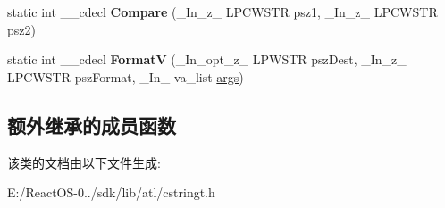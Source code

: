 \begin{DoxyCompactItemize}
\item 
\mbox{\label{class_a_t_l_1_1_ch_traits_c_r_t_a1699bde99948f27e268fe49dbe222815}} 
static int \+\_\+\+\_\+cdecl {\bfseries Compare} (\+\_\+\+In\+\_\+z\+\_\+ L\+P\+C\+W\+S\+TR psz1, \+\_\+\+In\+\_\+z\+\_\+ L\+P\+C\+W\+S\+TR psz2)
\item 
\mbox{\label{class_a_t_l_1_1_ch_traits_c_r_t_a9d1c9a3444e601dccda34856ceb62945}} 
static int \+\_\+\+\_\+cdecl {\bfseries FormatV} (\+\_\+\+In\+\_\+opt\+\_\+z\+\_\+ L\+P\+W\+S\+TR psz\+Dest, \+\_\+\+In\+\_\+z\+\_\+ L\+P\+C\+W\+S\+TR psz\+Format, \+\_\+\+In\+\_\+ va\+\_\+list \hyperlink{structargs}{args})
\end{DoxyCompactItemize}
\subsection*{额外继承的成员函数}


该类的文档由以下文件生成\+:\begin{DoxyCompactItemize}
\item 
E\+:/\+React\+O\+S-\/0../sdk/lib/atl/cstringt.\+h\end{DoxyCompactItemize}
